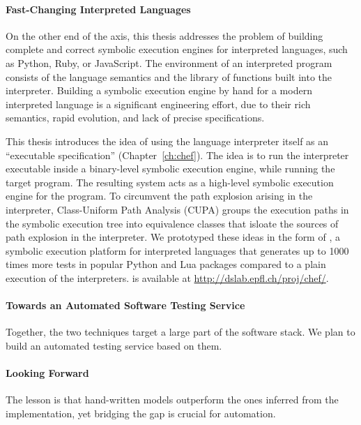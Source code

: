\paragraph{Fast-Changing Interpreted Languages}

On the other end of the axis, this thesis addresses the problem of building complete and correct symbolic execution engines for interpreted languages, such as Python, Ruby, or JavaScript.
%
The environment of an interpreted program consists of the language semantics and the library of functions built into the interpreter.
%
Building a symbolic execution engine by hand for a modern interpreted language is a significant engineering effort, due to their rich semantics, rapid evolution, and lack of precise specifications.

This thesis introduces the idea of using the language interpreter itself as an ``executable specification'' (Chapter~\ref{ch:chef}).
%
The idea is to run the interpreter executable inside a binary-level symbolic execution engine, while running the target program.  The resulting system acts as a high-level symbolic execution engine for the program.
%
To circumvent the path explosion arising in the interpreter, Class-Uniform Path Analysis (CUPA) groups the execution paths in the symbolic execution tree into equivalence classes that isloate the sources of path explosion in the interpreter.
%
We prototyped these ideas in the form of \chef, a symbolic execution platform for interpreted languages that generates up to 1000 times more tests in popular Python and Lua packages compared to a plain execution of the interpreters.
%
\chef is available at {\url{http://dslab.epfl.ch/proj/chef/}}.


\paragraph{Towards an Automated Software Testing Service}

Together, the two techniques target a large part of the software stack.  We plan to build an automated testing service based on them.


\paragraph{Looking Forward}

The lesson is that hand-written models outperform the ones inferred from the implementation, yet bridging the gap is crucial for automation.

